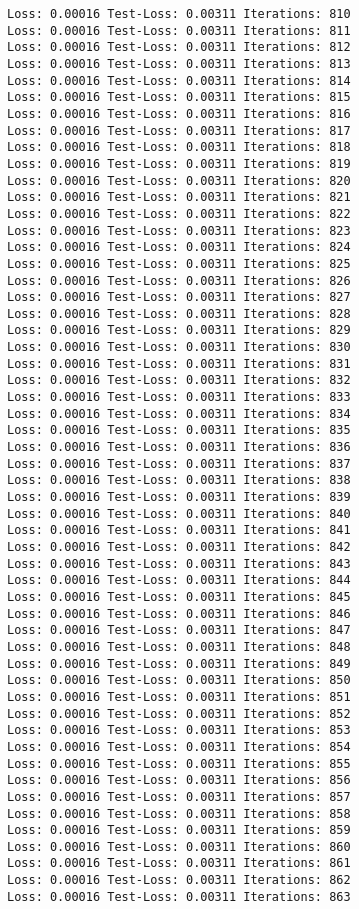 \documentclass[11pt]{article}
\begin{document}
\begin{Verbatim}[commandchars=\\\{\}]
Loss: 0.00016 Test-Loss: 0.00311 Iterations: 810
Loss: 0.00016 Test-Loss: 0.00311 Iterations: 811
Loss: 0.00016 Test-Loss: 0.00311 Iterations: 812
Loss: 0.00016 Test-Loss: 0.00311 Iterations: 813
Loss: 0.00016 Test-Loss: 0.00311 Iterations: 814
Loss: 0.00016 Test-Loss: 0.00311 Iterations: 815
Loss: 0.00016 Test-Loss: 0.00311 Iterations: 816
Loss: 0.00016 Test-Loss: 0.00311 Iterations: 817
Loss: 0.00016 Test-Loss: 0.00311 Iterations: 818
Loss: 0.00016 Test-Loss: 0.00311 Iterations: 819
Loss: 0.00016 Test-Loss: 0.00311 Iterations: 820
Loss: 0.00016 Test-Loss: 0.00311 Iterations: 821
Loss: 0.00016 Test-Loss: 0.00311 Iterations: 822
Loss: 0.00016 Test-Loss: 0.00311 Iterations: 823
Loss: 0.00016 Test-Loss: 0.00311 Iterations: 824
Loss: 0.00016 Test-Loss: 0.00311 Iterations: 825
Loss: 0.00016 Test-Loss: 0.00311 Iterations: 826
Loss: 0.00016 Test-Loss: 0.00311 Iterations: 827
Loss: 0.00016 Test-Loss: 0.00311 Iterations: 828
Loss: 0.00016 Test-Loss: 0.00311 Iterations: 829
Loss: 0.00016 Test-Loss: 0.00311 Iterations: 830
Loss: 0.00016 Test-Loss: 0.00311 Iterations: 831
Loss: 0.00016 Test-Loss: 0.00311 Iterations: 832
Loss: 0.00016 Test-Loss: 0.00311 Iterations: 833
Loss: 0.00016 Test-Loss: 0.00311 Iterations: 834
Loss: 0.00016 Test-Loss: 0.00311 Iterations: 835
Loss: 0.00016 Test-Loss: 0.00311 Iterations: 836
Loss: 0.00016 Test-Loss: 0.00311 Iterations: 837
Loss: 0.00016 Test-Loss: 0.00311 Iterations: 838
Loss: 0.00016 Test-Loss: 0.00311 Iterations: 839
Loss: 0.00016 Test-Loss: 0.00311 Iterations: 840
Loss: 0.00016 Test-Loss: 0.00311 Iterations: 841
Loss: 0.00016 Test-Loss: 0.00311 Iterations: 842
Loss: 0.00016 Test-Loss: 0.00311 Iterations: 843
Loss: 0.00016 Test-Loss: 0.00311 Iterations: 844
Loss: 0.00016 Test-Loss: 0.00311 Iterations: 845
Loss: 0.00016 Test-Loss: 0.00311 Iterations: 846
Loss: 0.00016 Test-Loss: 0.00311 Iterations: 847
Loss: 0.00016 Test-Loss: 0.00311 Iterations: 848
Loss: 0.00016 Test-Loss: 0.00311 Iterations: 849
Loss: 0.00016 Test-Loss: 0.00311 Iterations: 850
Loss: 0.00016 Test-Loss: 0.00311 Iterations: 851
Loss: 0.00016 Test-Loss: 0.00311 Iterations: 852
Loss: 0.00016 Test-Loss: 0.00311 Iterations: 853
Loss: 0.00016 Test-Loss: 0.00311 Iterations: 854
Loss: 0.00016 Test-Loss: 0.00311 Iterations: 855
Loss: 0.00016 Test-Loss: 0.00311 Iterations: 856
Loss: 0.00016 Test-Loss: 0.00311 Iterations: 857
Loss: 0.00016 Test-Loss: 0.00311 Iterations: 858
Loss: 0.00016 Test-Loss: 0.00311 Iterations: 859
Loss: 0.00016 Test-Loss: 0.00311 Iterations: 860
Loss: 0.00016 Test-Loss: 0.00311 Iterations: 861
Loss: 0.00016 Test-Loss: 0.00311 Iterations: 862
Loss: 0.00016 Test-Loss: 0.00311 Iterations: 863

\end{Verbatim}
\end{document}
